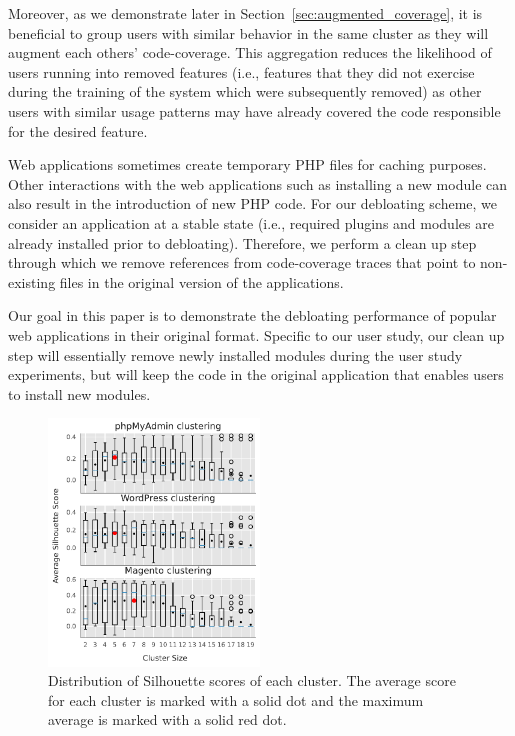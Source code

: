 Moreover, as we demonstrate later in Section~\ref{sec:augmented_coverage}, it is beneficial to group users with similar behavior in the same cluster as they will augment each others' code-coverage. 
This aggregation reduces the likelihood of users running into removed features (i.e., features that they did not exercise during the training of the system which were subsequently removed) as other users with similar usage patterns may have already covered the code responsible for the desired feature. 

Web applications sometimes create temporary PHP files for caching purposes. 
Other interactions with the web applications such as installing a new module can also result in the introduction of new PHP code. 
For our debloating scheme, we consider an application at a stable state (i.e., required plugins and modules are already installed prior to debloating). 
Therefore, we perform a clean up step through which we remove references from code-coverage traces that point to non-existing files in the original version of the applications. 

Our goal in this paper is to demonstrate the debloating performance of popular web applications in their original format. 
Specific to our user study, our clean up step will essentially remove newly installed modules during the user study experiments, but will keep the code in the original application that enables users to install new modules. 

\begin{figure}[]
    \centering
    \includegraphics[width=0.50\textwidth]{figures/dbltr/silhouette.pdf}
    \caption{Distribution of Silhouette scores of each cluster. The average score for each cluster is marked with a solid dot and the maximum average is marked with a solid red dot.}
    \label{fig:silhouette_scores}
    \vspace{-1em}
\end{figure}

